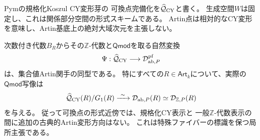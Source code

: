 Pym\cite[Definition~2.8]{Pym}の規格化Koszul CY変形芽の
可換点完備化を$\widehat{\mathcal Q}_{\mathrm{CY}}$と書く。
生成空間$W$は固定し、これは関係部分空間の形式スキームである。
Artin点は相対的なCY変形を意味し、Artin基底上の絶対大域次元を主張しない。

\begin{theorem}
\label{thm:formal-ambient-cy-comparison}
次数付き代数$B_R$からその$\mathbb Z$-代数と$\mathsf{Qmod}$を取る自然変換
\begin{equation}\label{eq:formal-cy-framed-map}
 \Psi:\widehat{\mathcal Q}_{\mathrm{CY}}
 \longrightarrow\mathcal D^{\mathrm{pf}}_{\mathrm{ab},P}
\end{equation}
は、集合値Artin関手の同型である。
特にすべての$R\in\mathsf{Art}_k$について、実際の$\mathsf{Qmod}$写像は
\begin{equation}\label{eq:formal-ambient-cy-quotient}
 \widehat{\mathcal Q}_{\mathrm{CY}}(R)/G_1(R)
 \xrightarrow{\ \sim\ }
 \mathcal D_{\mathrm{ab},P}(R)
 \simeq\mathcal D_{\mathbb Z,P}(R)
\end{equation}
を与える。
従って可換点の形式近傍では、規格化CY表示と
一般$\mathbb Z$-代数表示の間に追加の古典的Artin変形方向はない。
これは特殊ファイバーの標識を保つ局所主張である。
\end{theorem}
